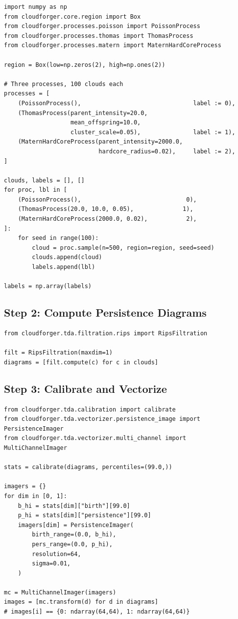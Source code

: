 \documentclass[11pt, a4paper]{article}
\begin{document}
\begin{lstlisting}
import numpy as np
from cloudforger.core.region import Box
from cloudforger.processes.poisson import PoissonProcess
from cloudforger.processes.thomas import ThomasProcess
from cloudforger.processes.matern import MaternHardCoreProcess

region = Box(low=np.zeros(2), high=np.ones(2))

# Three processes, 100 clouds each
processes = [
    (PoissonProcess(),                                label := 0),
    (ThomasProcess(parent_intensity=20.0,
                   mean_offspring=10.0,
                   cluster_scale=0.05),               label := 1),
    (MaternHardCoreProcess(parent_intensity=2000.0,
                           hardcore_radius=0.02),     label := 2),
]

clouds, labels = [], []
for proc, lbl in [
    (PoissonProcess(),                              0),
    (ThomasProcess(20.0, 10.0, 0.05),              1),
    (MaternHardCoreProcess(2000.0, 0.02),           2),
]:
    for seed in range(100):
        cloud = proc.sample(n=500, region=region, seed=seed)
        clouds.append(cloud)
        labels.append(lbl)

labels = np.array(labels)
\end{lstlisting}

\subsection{Step 2: Compute Persistence Diagrams}

\begin{lstlisting}
from cloudforger.tda.filtration.rips import RipsFiltration

filt = RipsFiltration(maxdim=1)
diagrams = [filt.compute(c) for c in clouds]
\end{lstlisting}

\subsection{Step 3: Calibrate and Vectorize}

\begin{lstlisting}
from cloudforger.tda.calibration import calibrate
from cloudforger.tda.vectorizer.persistence_image import PersistenceImager
from cloudforger.tda.vectorizer.multi_channel import MultiChannelImager

stats = calibrate(diagrams, percentiles=(99.0,))

imagers = {}
for dim in [0, 1]:
    b_hi = stats[dim]["birth"][99.0]
    p_hi = stats[dim]["persistence"][99.0]
    imagers[dim] = PersistenceImager(
        birth_range=(0.0, b_hi),
        pers_range=(0.0, p_hi),
        resolution=64,
        sigma=0.01,
    )

mc = MultiChannelImager(imagers)
images = [mc.transform(d) for d in diagrams]
# images[i] == {0: ndarray(64,64), 1: ndarray(64,64)}
\end{lstlisting}
\end{document}
